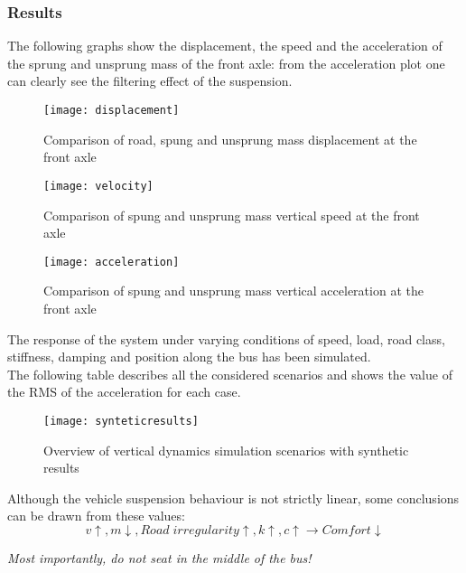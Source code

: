 \documentclass{article}
\begin{document}
\subsubsection{Results}
The following graphs show the displacement, the speed and the acceleration of the sprung and unsprung mass of the front axle: from the acceleration plot one can clearly see the filtering effect of the suspension. 
\begin{figure}[H]
\centering
\texttt{[image: displacement]}
\caption{Comparison of road, spung and unsprung mass displacement at the front axle}
\end{figure}
\begin{figure}[H]
\centering
\texttt{[image: velocity]}
\caption{Comparison of spung and unsprung mass vertical speed at the front axle}
\end{figure}
\begin{figure}[H]
\centering
\texttt{[image: acceleration]}
\caption{Comparison of spung and unsprung mass vertical acceleration at the front axle}
\end{figure}
The response of the system under varying conditions of speed, load, road class, stiffness, damping and position along the bus has been simulated.\\
The following table describes all the considered scenarios and shows the value of the RMS of the acceleration for each case. 
\begin{figure}[H]
\centering
\texttt{[image: synteticresults]}
\caption{Overview of vertical dynamics simulation scenarios with synthetic results}
\end{figure}
Although the vehicle suspension behaviour is not strictly linear, some conclusions can be drawn from these values: 
\begin{equation}
v \uparrow, m \downarrow, Road\;irregularity \uparrow, k \uparrow, c \uparrow \rightarrow Comfort \downarrow
\end{equation}
\begin{center}
\textit{Most importantly, do not seat in the middle of the bus!}
\end{center}
\end{document}
